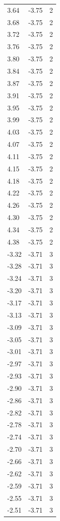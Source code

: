 \begin{longtable}{lrr}
  3.64 & -3.75 & 2 \\
  3.68 & -3.75 & 2 \\
  3.72 & -3.75 & 2 \\
  3.76 & -3.75 & 2 \\
  3.80 & -3.75 & 2 \\
  3.84 & -3.75 & 2 \\
  3.87 & -3.75 & 2 \\
  3.91 & -3.75 & 2 \\
  3.95 & -3.75 & 2 \\
  3.99 & -3.75 & 2 \\
  4.03 & -3.75 & 2 \\
  4.07 & -3.75 & 2 \\
  4.11 & -3.75 & 2 \\
  4.15 & -3.75 & 2 \\
  4.18 & -3.75 & 2 \\
  4.22 & -3.75 & 2 \\
  4.26 & -3.75 & 2 \\
  4.30 & -3.75 & 2 \\
  4.34 & -3.75 & 2 \\
  4.38 & -3.75 & 2 \\
  -3.32 & -3.71 & 3 \\
  -3.28 & -3.71 & 3 \\
  -3.24 & -3.71 & 3 \\
  -3.20 & -3.71 & 3 \\
  -3.17 & -3.71 & 3 \\
  -3.13 & -3.71 & 3 \\
  -3.09 & -3.71 & 3 \\
  -3.05 & -3.71 & 3 \\
  -3.01 & -3.71 & 3 \\
  -2.97 & -3.71 & 3 \\
  -2.93 & -3.71 & 3 \\
  -2.90 & -3.71 & 3 \\
  -2.86 & -3.71 & 3 \\
  -2.82 & -3.71 & 3 \\
  -2.78 & -3.71 & 3 \\
  -2.74 & -3.71 & 3 \\
  -2.70 & -3.71 & 3 \\
  -2.66 & -3.71 & 3 \\
  -2.62 & -3.71 & 3 \\
  -2.59 & -3.71 & 3 \\
  -2.55 & -3.71 & 3 \\
  -2.51 & -3.71 & 3 \\

\end{longtable}
